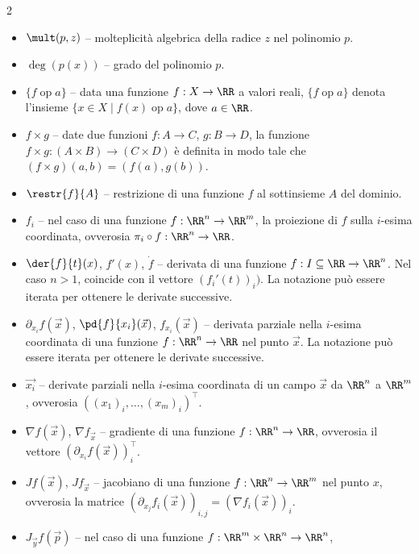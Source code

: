 \begin{multicols*}{2}
      \begin{itemize}
            \item $\mult(p, z)$ -- molteplicità algebrica della radice $z$ nel polinomio $p$.
            \item $\deg(p(x))$ -- grado del polinomio $p$.
            \item $\{f \operatorname{op} a\}$ -- data una funzione $f : X \to \RR$ a valori reali, $\{f \operatorname{op} a\}$ denota
                  l'insieme $\{ x \in X \mid f(x) \operatorname{op} a\}$, dove $a \in \RR$.
            \item $f \times g$ -- date due funzioni $f : A \to C$, $g : B \to D$, la funzione $f \times g : (A \times B) \to (C \times D)$ è
                  definita in modo tale che $(f \times g)(a, b) = (f(a), g(b))$.
            \item $\restr{f}{A}$ -- restrizione di una funzione $f$ al sottinsieme $A$ del dominio.
            \item $f_i$ -- nel caso di una funzione $f : \RR^n \to \RR^m$, la proiezione di $f$ sulla $i$-esima coordinata, ovverosia
                  $\pi_i \circ f : \RR^n \to \RR$.
            \item $\der{f}{t}(x)$, $f'(x)$, $\dot{f}$ -- derivata di una funzione $f : I \subseteq \RR \to \RR^n$. Nel caso $n > 1$, coincide con
                  il vettore $({f_i}'(t))_i)$. La notazione può essere iterata per ottenere le derivate successive.
            \item $\partial_{x_i} f(\vec{x})$, $\pd{f}{x_i}(\vec{x})$, $f_{x_i}(\vec{x})$ -- derivata parziale nella $i$-esima coordinata
                  di una funzione $f : \RR^n \to \RR$ nel punto $\vec{x}$. La notazione può essere iterata per ottenere le
                  derivate successive.
            \item $\vec{x_i}$ -- derivate parziali nella $i$-esima coordinata di un campo $\vec{x}$ da $\RR^n$ a $\RR^m$, ovverosia
                  $((x_1)_i, \ldots, (x_m)_i)^\top$.
            \item $\nabla f(\vec{x})$, $\nabla f_{\vec{x}}$ -- gradiente di una funzione $f : \RR^n \to \RR$, ovverosia il vettore $(\partial_{x_i} f(\vec{x}))_i^\top$.
            \item $J f(\vec{x})$, $J f_\vec{x}$ -- jacobiano di una funzione $f : \RR^n \to \RR^m$ nel punto $x$, ovverosia la matrice
                  $(\partial_{x_j} f_i (\vec{x}))_{i, j} = (\nabla f_i(\vec{x}))_{i}$.
            \item $J_{\vec{y}} f(\vec{p})$ -- nel caso di una funzione $f : \RR^{m} \times \RR^{n} \to \RR^{n}$,

\end{itemize}
\end{multicols*}

